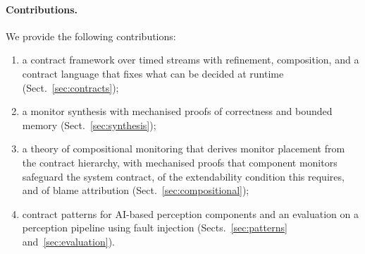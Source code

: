 \paragraph{Contributions.} We provide the following contributions:
\begin{enumerate}
  \item[(i)] a contract framework over timed streams with refinement, composition, and a contract language that fixes what can be decided at runtime (Sect.~\ref{sec:contracts});
  \item[(ii)] a monitor synthesis with mechanised proofs of correctness and bounded memory (Sect.~\ref{sec:synthesis});
  \item[(iii)] a theory of compositional monitoring that derives monitor placement from the contract hierarchy, with mechanised proofs that component monitors safeguard the system contract, of the extendability condition this requires, and of blame attribution (Sect.~\ref{sec:compositional});
  \item[(iv)] contract patterns for AI-based perception components and an evaluation on a perception pipeline using fault injection (Sects.~\ref{sec:patterns} and~\ref{sec:evaluation}).
\end{enumerate}

